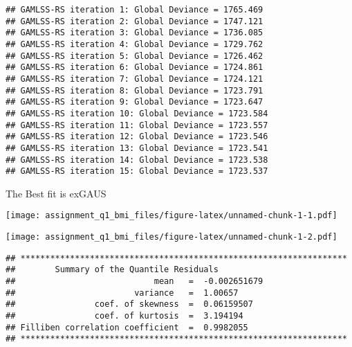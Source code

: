 \begin{verbatim}
## GAMLSS-RS iteration 1: Global Deviance = 1765.469 
## GAMLSS-RS iteration 2: Global Deviance = 1747.121 
## GAMLSS-RS iteration 3: Global Deviance = 1736.085 
## GAMLSS-RS iteration 4: Global Deviance = 1729.762 
## GAMLSS-RS iteration 5: Global Deviance = 1726.462 
## GAMLSS-RS iteration 6: Global Deviance = 1724.861 
## GAMLSS-RS iteration 7: Global Deviance = 1724.121 
## GAMLSS-RS iteration 8: Global Deviance = 1723.791 
## GAMLSS-RS iteration 9: Global Deviance = 1723.647 
## GAMLSS-RS iteration 10: Global Deviance = 1723.584 
## GAMLSS-RS iteration 11: Global Deviance = 1723.557 
## GAMLSS-RS iteration 12: Global Deviance = 1723.546 
## GAMLSS-RS iteration 13: Global Deviance = 1723.541 
## GAMLSS-RS iteration 14: Global Deviance = 1723.538 
## GAMLSS-RS iteration 15: Global Deviance = 1723.537
\end{verbatim}

The Best fit is exGAUS

\begin{Shaded}
\begin{Highlighting}[]
\OtherTok{\textless{}{-}} \NormalTok{, }\NormalTok{, }\NormalTok{(}\NormalTok{,}\NormalTok{), }\NormalTok{(}\NormalTok{,}\NormalTok{), }
\end{Highlighting}
\end{Shaded}

\texttt{[image: assignment\_q1\_bmi\_files/figure-latex/unnamed-chunk-1-1.pdf]}

\begin{Shaded}
\begin{Highlighting}[]
\end{Highlighting}
\end{Shaded}

\texttt{[image: assignment\_q1\_bmi\_files/figure-latex/unnamed-chunk-1-2.pdf]}

\begin{verbatim}
## ******************************************************************
##        Summary of the Quantile Residuals
##                            mean   =  -0.002651679 
##                        variance   =  1.00657 
##                coef. of skewness  =  0.06159507 
##                coef. of kurtosis  =  3.194194 
## Filliben correlation coefficient  =  0.9982055 
## ******************************************************************
\end{verbatim}


